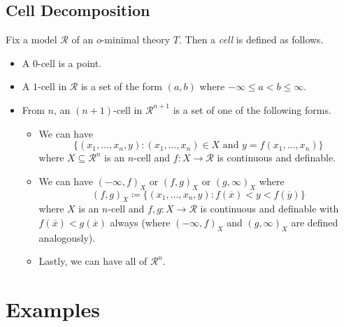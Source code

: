 \documentclass{article}
\begin{document}
\subsection{Cell Decomposition}
\begin{definition}[cell]
	Fix a model $\mathcal R$ of an $o$-minimal theory $T$. Then a \textit{cell} is defined as follows.
	\begin{itemize}
		\item A $0$-cell is a point.
		\item A $1$-cell in $\mathcal R$ is a set of the form $(a,b)$ where $-\infty\le a<b\le\infty$.
		\item From $n$, an $(n+1)$-cell in $\mathcal R^{n+1}$ is a set of one of the following forms.
		\begin{itemize}
			\item We can have
			\[\{(x_1,\ldots,x_n,y):(x_1,\ldots,x_n)\in X\text{ and }y=f(x_1,\ldots,x_n)\}\]
			where $X\subseteq\mathcal R^n$ is an $n$-cell and $f\colon X\to\mathcal R$ is continuous and definable.
			\item We can have $(-\infty,f)_X$ or $(f,g)_X$ or $(g,\infty)_X$ where
			\[(f,g)_X\coloneqq\{(x_1,\ldots,x_n,y):f(\overline x)<y<f(\overline y)\}\]
			where $X$ is an $n$-cell and $f,g\colon X\to\mathcal R$ is continuous and definable with $f(\overline x)<g(\overline x)$ always (where $(-\infty,f)_X$ and $(g,\infty)_X$ are defined analogously).
			\item Lastly, we can have all of $\mathcal R^n$.
		\end{itemize}
	\end{itemize}
\end{definition}

\newpage
\section{Examples}
\end{document}
